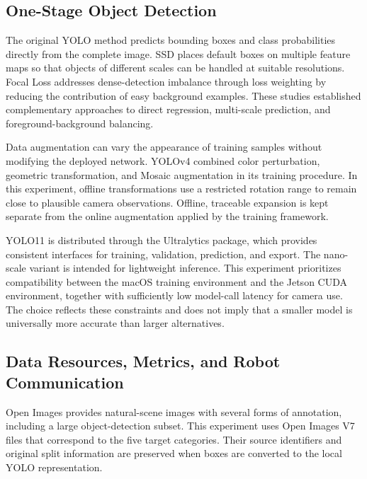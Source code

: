 \documentclass[12pt,a4paper]{article}
\begin{document}
\subsection{One-Stage Object Detection}

The original YOLO method predicts bounding boxes and class probabilities directly from the complete image\cite{redmon2016yolo}. SSD places default boxes on multiple feature maps so that objects of different scales can be handled at suitable resolutions\cite{liu2016ssd}. Focal Loss addresses dense-detection imbalance through loss weighting by reducing the contribution of easy background examples\cite{lin2017focal}. These studies established complementary approaches to direct regression, multi-scale prediction, and foreground-background balancing.

Data augmentation can vary the appearance of training samples without modifying the deployed network. YOLOv4 combined color perturbation, geometric transformation, and Mosaic augmentation in its training procedure\cite{bochkovskiy2020yolov4}. In this experiment, offline transformations use a restricted rotation range to remain close to plausible camera observations. Offline, traceable expansion is kept separate from the online augmentation applied by the training framework.

YOLO11 is distributed through the Ultralytics package, which provides consistent interfaces for training, validation, prediction, and export. The nano-scale variant is intended for lightweight inference\cite{jocher2024yolo11}. This experiment prioritizes compatibility between the macOS training environment and the Jetson CUDA environment, together with sufficiently low model-call latency for camera use. The choice reflects these constraints and does not imply that a smaller model is universally more accurate than larger alternatives.

\subsection{Data Resources, Metrics, and Robot Communication}

Open Images provides natural-scene images with several forms of annotation, including a large object-detection subset\cite{kuznetsova2020openimages}. This experiment uses Open Images V7 files that correspond to the five target categories\cite{openimagesv7}. Their source identifiers and original split information are preserved when boxes are converted to the local YOLO representation.
\end{document}
